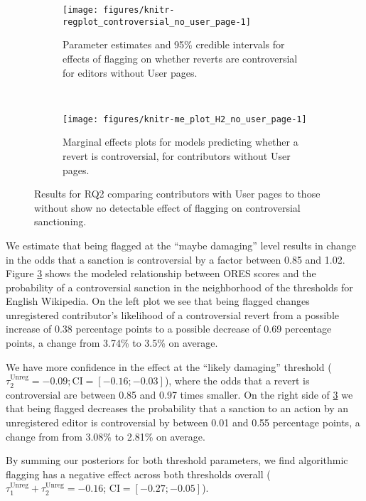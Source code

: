 \documentclass[format=acmsmall, natbib=true,  screen=true]{acmart}
\newenvironment{knitrout}{}{} %
\begin{document}
\begin{figure}
  \centering
\begin{subfigure}[t]{\textwidth}
  \centering
\begin{knitrout}
\color{fgcolor}
\texttt{[image: figures/knitr-regplot\_controversial\_no\_user\_page-1]} 

\end{knitrout}
\caption{Parameter estimates and 95\% credible intervals for effects of flagging on whether reverts are controversial for editors without User pages.}
\label{fig:h2.regplot}
\end{subfigure}
~
\begin{subfigure}[b]{\textwidth}
\centering  

\texttt{[image: figures/knitr-me\_plot\_H2\_no\_user\_page-1]} 

\caption[RQ2. me plot]{Marginal effects plots for models predicting whether a revert is controversial, for contributors without User pages.}
\label{fig:h2.me}
\end{subfigure}
\caption{Results for RQ2 comparing contributors with User pages to those without show no detectable effect of flagging on controversial sanctioning.}
\end{figure}

We estimate that being flagged at the ``maybe damaging'' level results in change in the odds that a sanction is controversial by a factor between 0.85 and 1.02.  Figure \ref{fig:h2.me} shows the modeled relationship between ORES scores and the probability of a controversial sanction in the neighborhood of the thresholds for English Wikipedia.  On the left plot we see that being flagged changes unregistered contributor's likelihood of a controversial revert from a possible increase of 
0.38 percentage points to a possible decrease of
 0.69 percentage points, a change from 
3.74\% to 
3.5\%
on average. 


We have more confidence in the effect at the ``likely damaging'' threshold ($\tau^{\mathrm{Unreg}}_{2}=-0.09;\mathrm{CI}=[-0.16;\allowbreak -0.03]$), where the odds that a revert is controversial are between 0.85 and 0.97 times smaller. On the right side of \ref{fig:h2.me} we that being flagged decreases the probability that a sanction to an action by an unregistered editor is controversial by between 0.01  and
0.55 percentage points, a change from 
from 
3.08\% to 
2.81\%
on average. 


By summing our posteriors for both threshold parameters, we find algorithmic flagging has a negative effect across both thresholds overall ($\tau^{\mathrm{Unreg}}_{1} + \tau^{\mathrm{Unreg}}_{2}=-0.16$; $\mathrm{CI}=[-0.27;\allowbreak -0.05]$). 
 
\end{document}
